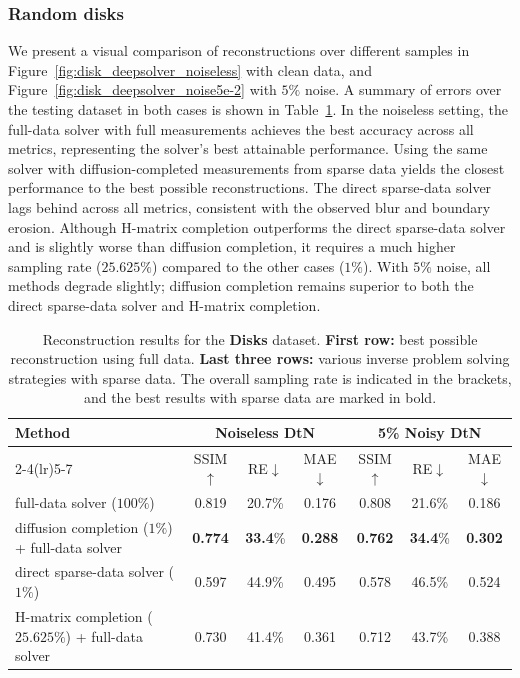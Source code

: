 \documentclass{article}
\begin{document}
\subsubsection{Random disks}\label{sec:random_disk}
We present a visual comparison of reconstructions over different samples in Figure~\ref{fig:disk_deepsolver_noiseless} with clean data, and Figure~\ref{fig:disk_deepsolver_noise5e-2} with $5\%$ noise. A summary of errors over the testing dataset in both cases is shown in Table~\ref{tab:disk_recon_combined}.
In the noiseless setting, the full-data solver with full measurements achieves the best accuracy across all metrics, representing the solver’s best attainable performance. 
Using the same solver with diffusion-completed measurements from sparse data yields the closest performance to the best possible reconstructions. 
The direct sparse-data solver lags behind across all metrics, consistent with the observed blur and boundary erosion. Although H-matrix completion outperforms the direct sparse-data solver and is slightly worse than diffusion completion, it requires a much higher sampling rate (\(25.625\%\)) compared to the other cases (\(1\%\)). 
With \(5\%\) noise, all methods degrade slightly; diffusion completion remains superior to both the direct sparse-data solver and H-matrix completion.

\begin{table}[!htbp]
    \centering
    \caption{Reconstruction results for the \textbf{Disks} dataset. 
    \textbf{First row:} best possible reconstruction using full data.
    \textbf{Last three rows:} various inverse problem solving strategies with sparse data. The overall sampling rate is indicated in the brackets, and the best results with sparse data are marked in bold. }
    \label{tab:disk_recon_combined}
    \renewcommand{\arraystretch}{1.25}
    \begin{tabular}{@{}lcccccc@{}}
        \toprule
        \multirow{2}{*}{Method} &
        \multicolumn{3}{c}{Noiseless DtN} &
        \multicolumn{3}{c}{5\% Noisy DtN} \\
        \cmidrule(lr){2-4}\cmidrule(lr){5-7}
        & SSIM$\uparrow$ & RE$\downarrow$  & MAE$\downarrow$  
        & SSIM$\uparrow$  & RE$\downarrow$   & MAE$\downarrow$  \\
        \midrule
        full-data solver ($100\%$)        & 0.819 & 20.7\% & 0.176  & 0.808 & 21.6\% & 0.186  \\
        \hline
        diffusion completion ($1\%$) + full-data solver & \textbf{0.774} & \textbf{33.4}\% & \textbf{0.288}  & \textbf{0.762} & \textbf{34.4}\% & \textbf{0.302}  \\
 
        direct sparse-data solver ($1\%$)                     & 0.597 & 44.9\% & 0.495 & 0.578 & 46.5\% & 0.524 \\
        H-matrix completion ($25.625\%$) + full-data solver & 0.730 & 41.4\% & 0.361 & 0.712& 43.7\% & 0.388\\
        
    
        \bottomrule
    \end{tabular}
\end{table}
\end{document}
